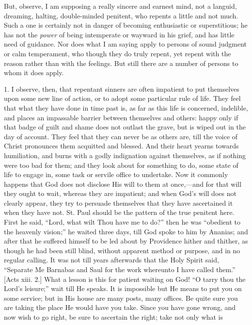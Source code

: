 But, observe, I am supposing a really sincere and earnest mind, not
a languid, dreaming, halting, double-minded penitent, who repents a
little and not much. Such a one is certainly not in danger of becoming
enthusiastic or superstitious; he has not the \emph{power} of being
intemperate or wayward in his grief, and has little need of guidance.
Nor does what I am saying apply to persons of sound judgment or calm
temperament, who though they do truly repent, yet repent with the
reason rather than with the feelings. But still there are a number of
persons to whom it does apply.

1. I observe, then, that repentant sinners are often impatient to
put themselves upon some new line of action, or to adopt some
particular rule of life. They feel that what they have done in time
past is, as far as this life is concerned, indelible, and places an
impassable barrier between themselves and others: happy only if that
badge of guilt and shame does not outlast the grave, but is wiped out
in the day of account. They feel that they can never be as others are,
till the voice of Christ pronounces them acquitted and blessed. And
their heart yearns towards humiliation, and burns with a godly
indignation against themselves, as if nothing were too bad for them;
and they look about for something to do, some state of life to engage
in, some task or servile office to undertake. Now it commonly happens
that God does not disclose His will to them at once,—and for that
will they ought to wait, whereas they are impatient; and when God's
will does not clearly appear, they try to persuade themselves that
they have ascertained it when they have not. St. Paul should be the
pattern of the true penitent here. First he said, ``Lord, what
wilt Thou have me to do?'' then he was ``obedient to the
heavenly vision;'' he waited three days, till God spoke to him by
Ananias; and after that he suffered himself to be led about by
Providence hither and thither, as though he had been still blind,
without apparent method or purpose, and in no regular calling. It was
not till years afterwards that the Holy Spirit said, ``Separate Me
Barnabas and Saul for the work whereunto I have called them.''
[Acts xiii. 2.] What a lesson is this for patient waiting on God!
``O tarry thou the Lord's leisure;'' wait till He speaks. It
is impossible but He means to put you on some service; but in His
house are many posts, many offices. Be quite sure you are taking the
place He would have you take. Since you have gone wrong, and now wish
to go right, be sure to ascertain the right; take not only what is
